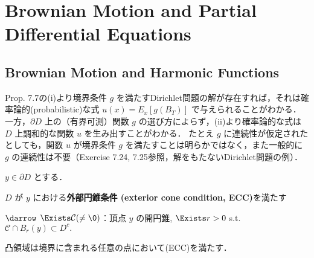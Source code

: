 \documentclass{jsarticle}
\title{}
\author{}
\date{
}
\begin{document}
\setcounter{section}{6}
\section{Brownian Motion and Partial Differential Equations}
\setcounter{subsection}{1}
\subsection{Brownian Motion and Harmonic Functions}

Prop. 7.7の(i)より境界条件 $g$ を満たすDirichlet問題の解が存在すれば，それは確率論的(probabilistic)な式 $u(x)=E_x[g(B_T)]$ で与えられることがわかる．
一方，$\partial D$ 上の（有界可測）関数 $g$ の選び方によらず，(ii)より確率論的な式は $D$ 上調和的な関数 $u$ を生み出すことがわかる．
たとえ $g$ に連続性が仮定されたとしても，関数 $u$ が境界条件 $g$ を満たすことは明らかではなく，また一般的に $g$ の連続性は不要（Exercise 7.24, 7.25参照，解をもたないDirichlet問題の例）．

\begin{df*}
    $y\in\partial D$ とする．
    
    $D$ が $y$ における\textbf{外部円錐条件 (exterior cone condition, ECC)}を満たす
    
    $\darrow$
    $\Exists \mathcal{C}(\neq\0)$：頂点 $y$ の開円錐, $\Exists r>0$ s.t. $\mathcal{C}\cap B_r(y)\subset D^c.$
\end{df*}

\begin{ex*}
    凸領域は境界に含まれる任意の点において(ECC)を満たす．
\end{ex*}
\end{document}
